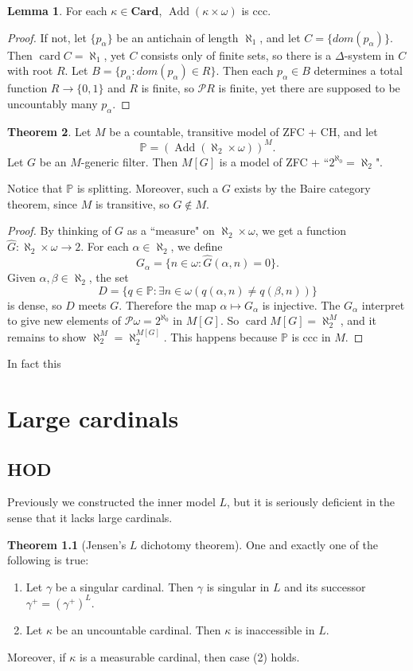 \documentclass[12pt]{report}
\newcommand{\PP}{\mathbb{P}}
\newcommand{\card}{\operatorname{card}}
\newcommand{\pset}{\mathcal{P}}
\newcommand{\Card}{\mathbf{Card}}
\DeclareMathOperator{\Add}{Add}
\theoremstyle{definition}
\newtheorem{theorem}{Theorem}[chapter]
\newtheorem{lemma}[theorem]{Lemma}
\begin{document}
\begin{lemma}
    For each $\kappa \in \Card$, $\Add(\kappa \times \omega)$ is ccc.
\end{lemma}
\begin{proof}
    If not, let $\{p_\alpha\}$ be an antichain of length $\aleph_1$, and let $C = \{dom(p_\alpha)\}$. Then $\card C = \aleph_1$, yet $C$ consists only of finite sets, so there is a $\Delta$-system in $C$ with root $R$. Let $B = \{p_\alpha: dom(p_\alpha) \in R\}$. Then each $p_\alpha \in B$ determines a total function $R \to \{0, 1\}$ and $R$ is finite, so $\pset R$ is finite, yet there are supposed to be uncountably many $p_\alpha$.
\end{proof}

\begin{theorem}
    Let $M$ be a countable, transitive model of ZFC + CH, and let
    $$\PP = (\Add(\aleph_2 \times \omega))^M.$$
    Let $G$ be an $M$-generic filter. Then $M[G]$ is a model of ZFC + ``$2^{\aleph_0} = \aleph_2$".
\end{theorem}
    Notice that $\PP$ is splitting. Moreover, such a $G$ exists by the Baire category theorem, since $M$ is transitive, so $G \notin M$.
\begin{proof}
    By thinking of $G$ as a ``measure" on $\aleph_2 \times \omega$, we get a function $\hat G: \aleph_2 \times \omega \to 2$. For each $\alpha \in \aleph_2$, we define
    $$G_\alpha = \{n \in \omega: \hat G(\alpha, n) = 0\}.$$
    Given $\alpha, \beta \in \aleph_2$, the set
    $$D = \{q \in \PP: \exists n \in \omega(q(\alpha, n) \neq q(\beta, n))\}$$
    is dense, so $D$ meets $G$. Therefore the map $\alpha \mapsto G_\alpha$ is injective. The $G_\alpha$ interpret to give new elements of $\pset \omega = 2^{\aleph_0}$ in $M[G]$. So $\card M[G] = \aleph_2^M$, and it remains to show $\aleph_2^M = \aleph_2^{M[G]}$. This happens because $\PP$ is ccc in $M$.
\end{proof}
    In fact this





\chapter{Large cardinals}
\section{HOD}
Previously we constructed the inner model $L$, but it is seriously deficient in the sense that it lacks large cardinals.
\begin{theorem}[Jensen's $L$ dichotomy theorem]
One and exactly one of the following is true:
\begin{enumerate}
    \item Let $\gamma$ be a singular cardinal. Then $\gamma$ is singular in $L$ and its successor $\gamma^+ = (\gamma^+)^L$.
    \item Let $\kappa$ be an uncountable cardinal. Then $\kappa$ is inaccessible in $L$.
\end{enumerate}
Moreover, if $\kappa$ is a measurable cardinal, then case (2) holds.
\end{theorem}
\end{document}
